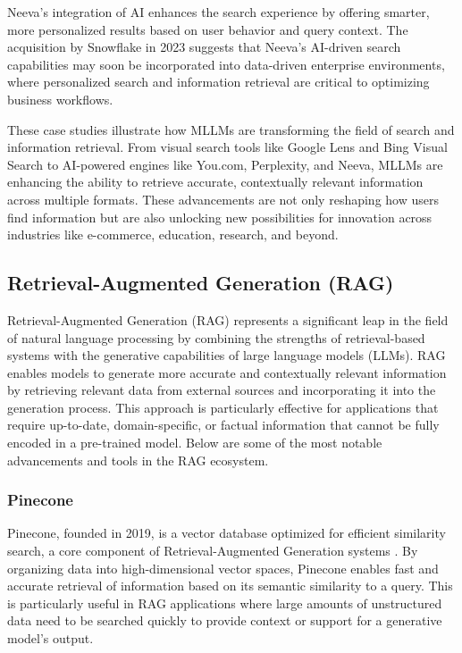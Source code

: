 Neeva's integration of AI enhances the search experience by offering smarter, more personalized results based on user behavior and query context. 
The acquisition by Snowflake in 2023 suggests that Neeva's AI-driven search capabilities may soon be incorporated into data-driven enterprise environments, where personalized search and information retrieval are critical to optimizing business workflows.

These case studies illustrate how MLLMs are transforming the field of search and information retrieval. 
From visual search tools like Google Lens and Bing Visual Search to AI-powered engines like You.com, Perplexity, and Neeva, MLLMs are enhancing the ability to retrieve accurate, contextually relevant information across multiple formats. 
These advancements are not only reshaping how users find information but are also unlocking new possibilities for innovation across industries like e-commerce, education, research, and beyond.

\subsection{Retrieval-Augmented Generation (RAG)}

Retrieval-Augmented Generation (RAG) represents a significant leap in the field of natural language processing by combining the strengths of retrieval-based systems with the generative capabilities of large language models (LLMs). 
RAG enables models to generate more accurate and contextually relevant information by retrieving relevant data from external sources and incorporating it into the generation process. 
This approach is particularly effective for applications that require up-to-date, domain-specific, or factual information that cannot be fully encoded in a pre-trained model. 
Below are some of the most notable advancements and tools in the RAG ecosystem.

\subsubsection{Pinecone}

Pinecone, founded in 2019, is a vector database optimized for efficient similarity search, a core component of Retrieval-Augmented Generation systems \cite{Pinecone}. 
By organizing data into high-dimensional vector spaces, Pinecone enables fast and accurate retrieval of information based on its semantic similarity to a query. 
This is particularly useful in RAG applications where large amounts of unstructured data need to be searched quickly to provide context or support for a generative model's output.

